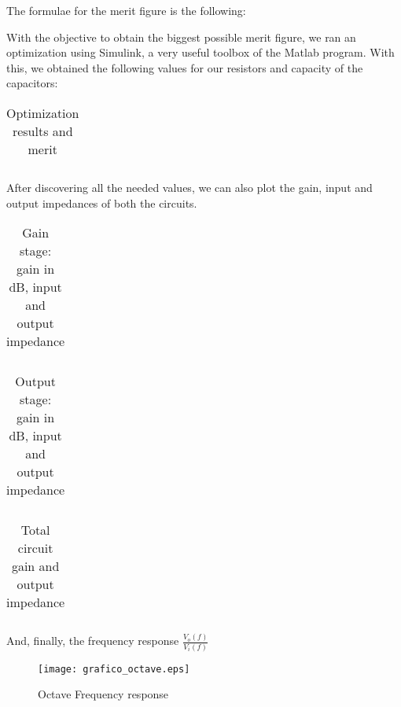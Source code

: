 The formulae for the merit figure is the following:


With the objective to obtain the biggest possible merit figure, we ran an optimization using Simulink, a very useful toolbox of the Matlab program. With this, we obtained the following values for our resistors and capacity of the capacitors:

\begin{table}[H]
\centering
\begin{tabularx}{0.6\textwidth} {
  | >{\raggedright\arraybackslash}X
  | >{\raggedleft\arraybackslash}X | }
 \hline

\end{tabularx}
\caption{Optimization results and merit}
\end{table}

After discovering all the needed values, we can also plot the gain, input and output impedances of both the circuits.

\begin{table}[H]
\centering
\begin{tabularx}{0.6\textwidth} {
  | >{\raggedright\arraybackslash}X
  | >{\raggedleft\arraybackslash}X | }
 \hline

\end{tabularx}
\caption{Gain stage: gain in dB, input and output impedance}
\end{table}

\begin{table}[H]
\centering
\begin{tabularx}{0.6\textwidth} {
  | >{\raggedright\arraybackslash}X
  | >{\raggedleft\arraybackslash}X | }
 \hline

\end{tabularx}
\caption{Output stage: gain in dB, input and output impedance}
\end{table}

\begin{table}[H]
\centering
\begin{tabularx}{0.6\textwidth} {
  | >{\raggedright\arraybackslash}X
  | >{\raggedleft\arraybackslash}X | }
 \hline

\end{tabularx}
\caption{Total circuit gain and output impedance}
\end{table}

And, finally, the frequency response $\frac{V_o(f)}{V_i(f)}$

\begin{figure}[H]\centering
\texttt{[image: grafico\_octave.eps]}
\caption{Octave Frequency response}
\label{fig:snat}
\end{figure}


